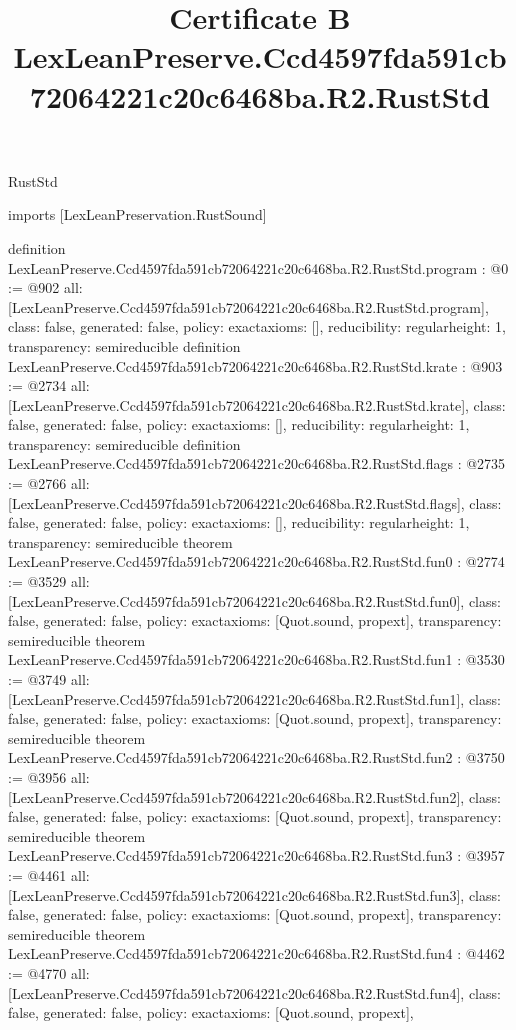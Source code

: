 \begin{lexlean}{RustStd}
\title{Certificate B LexLeanPreserve.Ccd4597fda591cb72064221c20c6468ba.R2.RustStd}
\begin{coremodule}
imports [LexLeanPreservation.RustSound]

definition LexLeanPreserve.Ccd4597fda591cb72064221c20c6468ba.R2.RustStd.program : @0 := @902 {
  all: [LexLeanPreserve.Ccd4597fda591cb72064221c20c6468ba.R2.RustStd.program],
  class: false,
  generated: false,
  policy: exact{axioms: []},
  reducibility: regular{height: 1},
  transparency: semireducible
}
definition LexLeanPreserve.Ccd4597fda591cb72064221c20c6468ba.R2.RustStd.krate : @903 := @2734 {
  all: [LexLeanPreserve.Ccd4597fda591cb72064221c20c6468ba.R2.RustStd.krate],
  class: false,
  generated: false,
  policy: exact{axioms: []},
  reducibility: regular{height: 1},
  transparency: semireducible
}
definition LexLeanPreserve.Ccd4597fda591cb72064221c20c6468ba.R2.RustStd.flags : @2735 := @2766 {
  all: [LexLeanPreserve.Ccd4597fda591cb72064221c20c6468ba.R2.RustStd.flags],
  class: false,
  generated: false,
  policy: exact{axioms: []},
  reducibility: regular{height: 1},
  transparency: semireducible
}
theorem LexLeanPreserve.Ccd4597fda591cb72064221c20c6468ba.R2.RustStd.fun0 : @2774 := @3529 {
  all: [LexLeanPreserve.Ccd4597fda591cb72064221c20c6468ba.R2.RustStd.fun0],
  class: false,
  generated: false,
  policy: exact{axioms: [Quot.sound, propext]},
  transparency: semireducible
}
theorem LexLeanPreserve.Ccd4597fda591cb72064221c20c6468ba.R2.RustStd.fun1 : @3530 := @3749 {
  all: [LexLeanPreserve.Ccd4597fda591cb72064221c20c6468ba.R2.RustStd.fun1],
  class: false,
  generated: false,
  policy: exact{axioms: [Quot.sound, propext]},
  transparency: semireducible
}
theorem LexLeanPreserve.Ccd4597fda591cb72064221c20c6468ba.R2.RustStd.fun2 : @3750 := @3956 {
  all: [LexLeanPreserve.Ccd4597fda591cb72064221c20c6468ba.R2.RustStd.fun2],
  class: false,
  generated: false,
  policy: exact{axioms: [Quot.sound, propext]},
  transparency: semireducible
}
theorem LexLeanPreserve.Ccd4597fda591cb72064221c20c6468ba.R2.RustStd.fun3 : @3957 := @4461 {
  all: [LexLeanPreserve.Ccd4597fda591cb72064221c20c6468ba.R2.RustStd.fun3],
  class: false,
  generated: false,
  policy: exact{axioms: [Quot.sound, propext]},
  transparency: semireducible
}
theorem LexLeanPreserve.Ccd4597fda591cb72064221c20c6468ba.R2.RustStd.fun4 : @4462 := @4770 {
  all: [LexLeanPreserve.Ccd4597fda591cb72064221c20c6468ba.R2.RustStd.fun4],
  class: false,
  generated: false,
  policy: exact{axioms: [Quot.sound, propext]},
}
\end{coremodule}
\end{lexlean}

